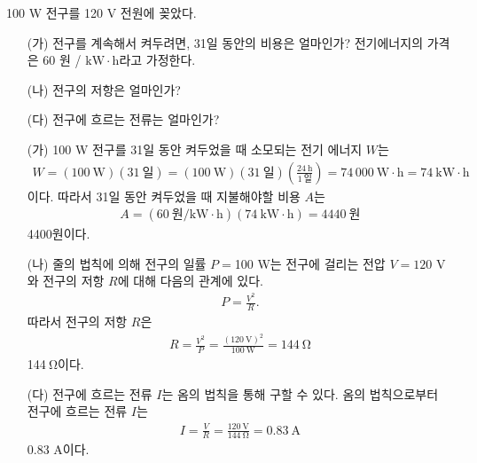 \documentclass[tightenlines,floatfix,nofootinbib,superscriptaddress,fleqn]{revtex4-2}
\begin{document}
 100 W 전구를 120 V 전원에 꽂았다.
\begin{itemize}
\item[(가)] 전구를 계속해서 켜두려면, 31일 동안의 비용은 얼마인가?
  전기에너지의 가격은 60 원 / $\mathrm{kW\cdot h}$라고 가정한다.
\item[(나)] 전구의 저항은 얼마인가?
\item[(다)] 전구에 흐르는 전류는 얼마인가? 
\end{itemize}
\begin{itemize}
  \item[(가)] 100 W 전구를 31일 동안 켜두었을 때 소모되는 전기 에너지 $W$는
  \begin{align}
    W = (100~\mathrm{W})(31~\text{일}) = (100~\mathrm{W})(31~\text{일})
    \left(\frac{24~\text{h}}{1~\text{일}}\right)
    =74\,000~\mathrm{W\cdot h}=74~\mathrm{kW\cdot h}
  \end{align}
 이다. 따라서 31일 동안 켜두었을 때 지불해야할 비용 $A$는
 \begin{align}
  A = (60~\text{원}/\mathrm{kW\cdot h})(74~\mathrm{kW\cdot h})
  =4440~\text{원}
 \end{align}
 4400원이다.
  \item[(나)] 줄의 법칙에 의해 전구의 일률 $P = $100 W는 전구에 걸리는 전압 $V=120$ V와
  전구의 저항 $R$에 대해 다음의 관계에 있다.
  \begin{align}
    P = \frac{V^2}{R}.
  \end{align}
  따라서 전구의 저항 $R$은
  \begin{align}
    R = \frac{V^2}{P} = \frac{(120~\mathrm{V})^2}{100~\mathrm{W}}
    =144~\mathrm{\Omega}
  \end{align}
  144$~\mathrm{\Omega}$이다.
  \item[(다)] 전구에 흐르는 전류 $I$는 옴의 법칙을 통해 구할 수 있다. 옴의 법칙으로부터
  전구에 흐르는 전류 $I$는
  \begin{align}
    I=\frac{V}{R} = \frac{120~\mathrm{V}}{144~\mathrm{\Omega}}
    =0.83~\mathrm{A}
  \end{align}
  0.83 A이다.
  
\end{itemize}


\newpage
\end{document}

